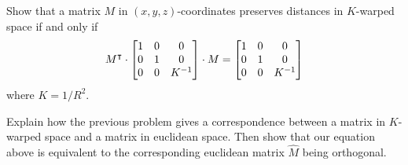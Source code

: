 \documentclass[newpage,hints,handout,noauthor,nooutcomes,12pt]{ximera}
\begin{document}
\begin{problem}
  Show that a matrix $M$ in $(x,y,z)$-coordinates preserves distances in
  $K$-warped space if and only if%
  \[
    M^\intercal \cdot\begin{bmatrix}
    1 & 0 & 0\\
    0 & 1 & 0\\
    0 & 0 & K^{-1}
    \end{bmatrix}
    \cdot M=\begin{bmatrix}
    1 & 0 & 0\\
    0 & 1 & 0\\
    0 & 0 & K^{-1}
    \end{bmatrix}
  \]
  where $K = 1/R^2$.
\begin{hint} 
  Explain how the previous problem gives a correspondence between a
  matrix in $K$-warped space and a matrix in euclidean space.  Then
  show that our equation above is equivalent to the corresponding
  euclidean matrix $\hat{M}$ being orthogonal.
\end{hint}
  


\end{problem}
\end{document}
